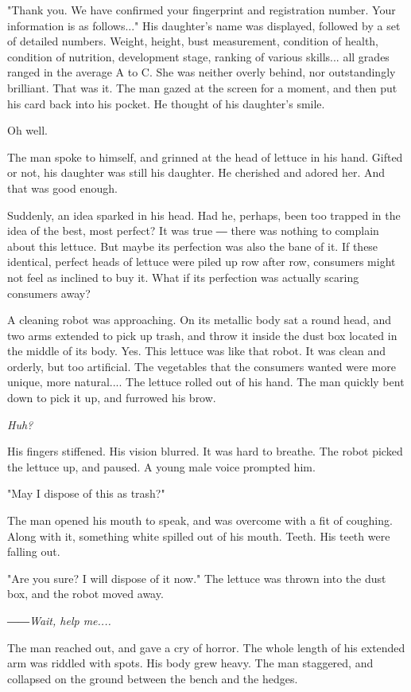 "Thank you. We have confirmed your fingerprint and registration number.
Your information is as follows..." His daughter's name was displayed,
followed by a set of detailed numbers. Weight, height, bust measurement,
condition of health, condition of nutrition, development stage, ranking
of various skills... all grades ranged in the average A to C. She was
neither overly behind, nor outstandingly brilliant. That was it. The man
gazed at the screen for a moment, and then put his card back into his
pocket. He thought of his daughter's smile.

Oh well.

The man spoke to himself, and grinned at the head of lettuce in his
hand. Gifted or not, his daughter was still his daughter. He cherished
and adored her. And that was good enough.

Suddenly, an idea sparked in his head. Had he, perhaps, been too trapped
in the idea of the best, most perfect? It was true ― there was nothing
to complain about this lettuce. But maybe its perfection was also the
bane of it. If these identical, perfect heads of lettuce were piled up
row after row, consumers might not feel as inclined to buy it. What if
its perfection was actually scaring consumers away?

A cleaning robot was approaching. On its metallic body sat a round head,
and two arms extended to pick up trash, and throw it inside the dust box
located in the middle of its body. Yes. This lettuce was like that
robot. It was clean and orderly, but too artificial. The vegetables that
the consumers wanted were more unique, more natural.... The lettuce
rolled out of his hand. The man quickly bent down to pick it up, and
furrowed his brow.

\emph{Huh?}

His fingers stiffened. His vision blurred. It was hard to breathe. The
robot picked the lettuce up, and paused. A young male voice prompted
him.

"May I dispose of this as trash?"

The man opened his mouth to speak, and was overcome with a fit of
coughing. Along with it, something white spilled out of his mouth.
Teeth. His teeth were falling out.

"Are you sure? I will dispose of it now." The lettuce was thrown into
the dust box, and the robot moved away.

\emph{――Wait, help me....}

The man reached out, and gave a cry of horror. The whole length of his
extended arm was riddled with spots. His body grew heavy. The man
staggered, and collapsed on the ground between the bench and the hedges.

